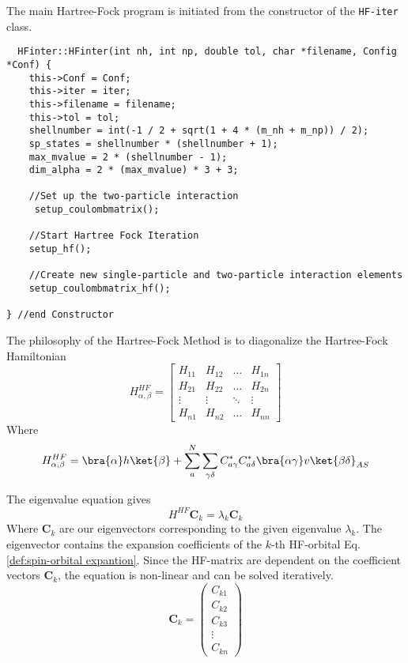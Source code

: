 The main Hartree-Fock program is initiated from the constructor of the \texttt{HF-iter} class. 
\begin{lstlisting}
  HFinter::HFinter(int nh, int np, double tol, char *filename, Config *Conf) {
    this->Conf = Conf;
    this->iter = iter;
    this->filename = filename;
    this->tol = tol;
    shellnumber = int(-1 / 2 + sqrt(1 + 4 * (m_nh + m_np)) / 2);
    sp_states = shellnumber * (shellnumber + 1);
    max_mvalue = 2 * (shellnumber - 1);
    dim_alpha = 2 * (max_mvalue) * 3 + 3;

    //Set up the two-particle interaction
     setup_coulombmatrix();
    
    //Start Hartree Fock Iteration  
    setup_hf();
    
    //Create new single-particle and two-particle interaction elements
    setup_coulombmatrix_hf();

} //end Constructor
\end{lstlisting}
%
The philosophy of the Hartree-Fock Method is to diagonalize the Hartree-Fock Hamiltonian
\begin{equation}
H_{\alpha,\beta}^{HF} = \begin{bmatrix} H_{11} & H_{12} & \hdots & H_{1n} \\ H_{21} & H_{22} & \hdots & H_{2n} \\ \vdots & \vdots & \ddots & \vdots \\ H_{n1} & H_{n2} & \hdots & H_{nn} \end{bmatrix}
  \label{HF-Hamiltonian}
\end{equation}
%
Where 
\begin{equation}
  H_{\alpha,\beta}^{HF} = \bra{\alpha}h\ket{\beta} + \sum_{a}^N \sum_{\gamma\delta}C_{a\gamma}^* C_{a\delta}^* \bra{\alpha \gamma} v \ket{\beta \delta}_{AS}
\end{equation}

%
The eigenvalue equation gives 
\begin{equation}
H^{HF} \mathbf{C}_k = \lambda_k \mathbf{C}_k
  \label{HF-eigenvalue}
\end{equation}
%
Where $\mathbf{C}_k$ are our eigenvectors corresponding to the given eigenvalue $\lambda_k$. The eigenvector contains the expansion coefficients of the $k$-th HF-orbital Eq. \ref{def:spin-orbital expantion}. Since the HF-matrix are dependent on the coefficient vectors $\mathbf{C}_k$, the equation is non-linear and can be solved iteratively. 
\begin{equation}
\mathbf{C}_k = \begin{pmatrix}C_{k1} \\ C_{k2} \\ C_{k3} \\ \vdots \\ C_{kn} \end{pmatrix}
 \label{coeff}
\end{equation}
%

